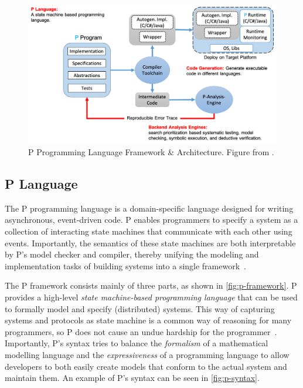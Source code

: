 \documentclass[conference]{IEEEtran}
\begin{document}
\begin{figure}[ht!]
	\centering
	\includegraphics[width=\linewidth]{p-toolchain.png}
	\caption{P Programming Language Framework \& Architecture. Figure from \cite{p_developers_formal_2023}.}
	\label{fig:p-framework}
\end{figure}

\subsection{P Language}\label{sec:P}
The P programming language is a domain-specific language designed for writing asynchronous, event-driven code. P enables programmers to specify a system as a collection of interacting state machines that communicate with each other using events. Importantly, the semantics of these state machines are both interpretable by P's model checker and compiler, thereby unifying the modeling and implementation tasks of building systems into a single framework~\cite{desai_compositinal_2018}.

The P framework consists mainly of three parts, as shown in \autoref{fig:p-framework}. P provides a high-level \textit{state machine-based programming language} that can be used to formally model and specify (distributed) systems. This way of capturing systems and protocols as state machine is a common way of reasoning for many programmers, so P does not cause an undue hardship for the programmer~\cite{deligiannis_programming_2015}. Importantly, P's syntax tries to balance the \textit{formalism} of a mathematical modelling language and the \textit{expressiveness} of a programming language to allow developers to both easily create models that conform to the actual system and maintain them. An example of P's syntax can be seen in \autoref{fig:p-syntax}.
\end{document}
